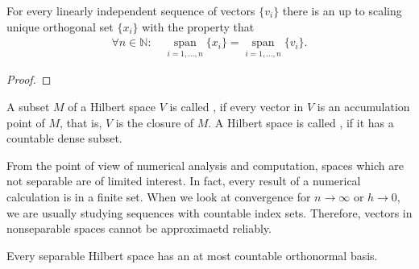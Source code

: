 \begin{lemma}
   For every linearly independent sequence of
  vectors $\{v_i\}$ there is an up to scaling unique orthogonal set
  $\{x_i\}$ with the property that
  \begin{gather*}
    \forall n\in \mathbb N:\quad
    \operatorname*{span}_{i=1,\dots,n} \{x_i\}
    =
    \operatorname*{span}_{i=1,\dots,n} \{v_i\}.
  \end{gather*}
\end{lemma}

\begin{todo}
  \begin{proof}
    
  \end{proof}
\end{todo}

\begin{definition}
  A subset $M$ of a Hilbert space $V$ is called , if
  every vector in $V$ is an accumulation point of $M$, that is, $V$ is
  the closure of $M$.  A Hilbert space is called ,
  if it has a countable dense subset.
\end{definition}

\begin{note}
  From the point of view of numerical analysis and computation, spaces
  which are not separable are of limited interest. In fact, every
  result of a numerical calculation is in a finite set. When we look
  at convergence for $n\to\infty$ or $h\to 0$, we are usually studying
  sequences with countable index sets. Therefore, vectors in
  nonseparable spaces cannot be approximaetd reliably.
\end{note}

\begin{theorem}
  Every separable Hilbert space has an at most countable orthonormal basis.
\end{theorem}

